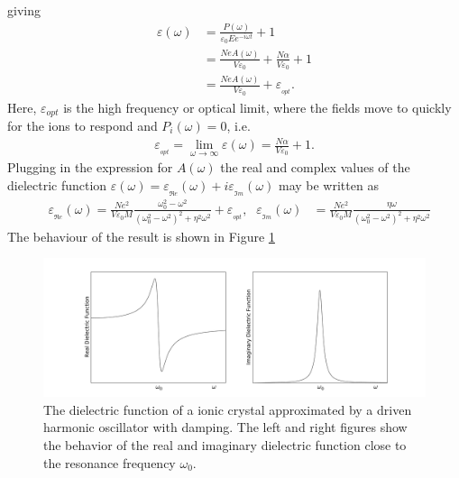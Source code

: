 giving
\begin{align}
   \varepsilon (\omega) &= \frac{P(\omega)}{\varepsilon_0 E e^{-i \omega t}} + 1  \\
                        &= \frac{NeA(\omega)}{V\varepsilon_0} + \frac{N \alpha}{V \varepsilon_0} + 1 \\
                        &= \frac{NeA(\omega)}{V\varepsilon_0} + \varepsilon\!_{_{opt}}.
\end{align}
Here, $\varepsilon_{opt}$ is the high frequency or optical limit, where the fields move to quickly for the 
ions to respond and $P_i(\omega) = 0$, i.e.
\begin{align}
   \varepsilon\!_{_{opt}} = \lim_{\omega\to\infty}\varepsilon (\omega)  
   = \frac{N \alpha}{V \varepsilon_0} + 1.
\end{align}
Plugging in the expression for $A(\omega)$ the real and complex values of the dielectric function 
$\varepsilon (\omega) = \varepsilon\!_{_{\Re\! e}} \!\! (\omega) + i \varepsilon\!_{_{\Im\! m}} \!\! (\omega)$ may be
written as
\begin{align}
   &\varepsilon\!_{_{\Re\! e}} \!\! (\omega)  = \frac{Ne^2}{V\varepsilon_0 M} 
   \frac{\omega_0^2 - \omega^2}{(\omega_0^2-\omega^2)^2 + \eta^2 \omega^2} + \varepsilon\!_{_{opt}}
   \text{,}
   &\varepsilon\!_{_{\Im \! m }} \!\! (\omega)  &= \frac{Ne^2}{V\varepsilon_0 M} 
   \frac{\eta \omega}{(\omega_0^2-\omega^2)^2 + \eta^2 \omega^2} 
\end{align}
The behaviour of the result is shown in Figure \ref{fig:dielectricResonance}
%
\begin{figure}[h!]
  \centering
   \includegraphics[width=1.0\textwidth]{Figures/dielectricResonance.pdf}
   \caption{
      The dielectric function of a ionic crystal approximated by
      a driven harmonic oscillator with damping. The left and right figures show the behavior
      of the real and imaginary dielectric function close to
      the resonance frequency $\omega_0$.
   }
   \label{fig:dielectricResonance}
\end{figure}
